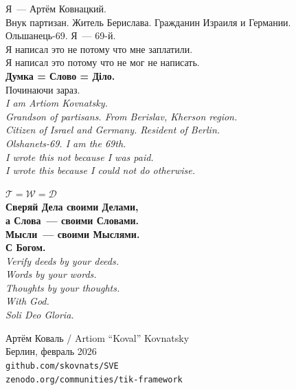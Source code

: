 \documentclass[11pt,a4paper]{article}
\theoremstyle{definition}
\theoremstyle{remark}
\newcommand{\Thought}{\mathcal{T}}
\newcommand{\Word}{\mathcal{W}}
\newcommand{\Deed}{\mathcal{D}}
\begin{document}
\begin{sichbox}

\foreignlanguage{russian}{
Я~--- Артём Ковнацкий.\\
Внук партизан. Житель Берислава.
Гражданин Израиля и Германии.\\
Ольшанець-69. Я~--- 69-й.\\[0.2cm]
Я написал это не потому что мне заплатили.\\
Я написал это потому что не мог не написать.\\[0.2cm]
\textbf{Думка = Слово = Діло.}\\
Починаючи зараз.\\[0.2cm]
}
\textit{I am Artiom Kovnatsky.\\
Grandson of partisans. From Berislav, Kherson region.\\
Citizen of Israel and Germany. Resident of Berlin.\\
Olshanets-69. I am the 69th.}\\[0.2cm]

\textit{I wrote this not because I was paid.\\
I wrote this because I could not do otherwise.}\\[0.3cm]

\begin{center}
{\color{goldcolor}
$\Thought = \Word = \Deed$\\[0.3cm]
\foreignlanguage{russian}{
\textbf{Сверяй Дела своими Делами,\\
а Слова~--- своими Словами.\\
Мысли~--- своими Мыслями.\\[0.2cm]
С Богом.}
}\\[0.2cm]
\textit{Verify deeds by your deeds.\\
Words by your words.\\
Thoughts by your thoughts.\\[0.2cm]
With God.}\\[0.3cm]
\foreignlanguage{russian}{
\textit{Soli Deo Gloria.}
}
}
\end{center}

\vspace{0.4cm}
\begin{flushright}
\foreignlanguage{russian}{
Артём Коваль / Artiom ``Koval'' Kovnatsky\\
Берлин, февраль 2026\\
\texttt{github.com/skovnats/SVE}\\
\texttt{zenodo.org/communities/tik-framework}
}
\end{flushright}
\end{sichbox}
\end{document}
